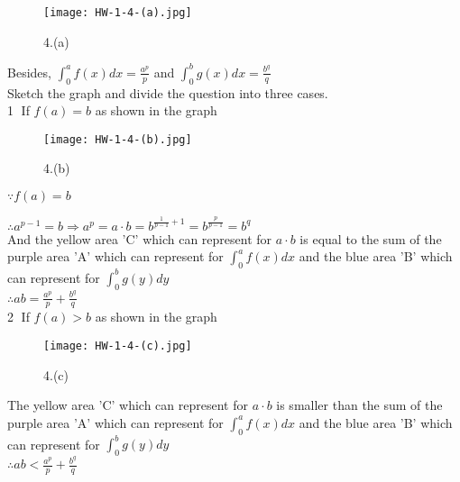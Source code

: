 \documentclass{article}
\begin{document}
\begin{figure}[H]
  \centering
  \texttt{[image: HW-1-4-(a).jpg]}\\
  \caption*{4.(a)}
\end{figure}

Besides, $\displaystyle\int_{0}^{a}f(x)dx=\frac{a^p}{p}$ and $\displaystyle\int_{0}^{b}g(x)dx=\frac{b^q}{q}$\\

Sketch the graph and divide the question into three cases.\\

\textcircled{1} If $f(a)=b$ as shown in the graph\\

\begin{figure}[H]
  \centering
  \texttt{[image: HW-1-4-(b).jpg]}\\
  \caption*{4.(b)}
\end{figure}

$\because$\qquad$f(a)=b$

$\therefore$\qquad$a^{p-1}=b\Rightarrow a^p=a\cdot b=b^{\frac{1}{p-1}+1}=b^{\frac{p}{p-1}}=b^{q}$\\

And the yellow area 'C' which can represent for $a\cdot b$ is equal to the sum of the purple area 'A' which can represent for $\displaystyle\int_{0}^{a}f(x)dx$ and the blue area 'B' which can represent for $\displaystyle\int_{0}^{b}g(y)dy$\\

$\therefore$\qquad$\displaystyle ab=\frac{a^p}{p}+\frac{b^q}{q}$\\

\textcircled{2} If $f(a)>b$ as shown in the graph\\

\begin{figure}[H]
  \centering
  \texttt{[image: HW-1-4-(c).jpg]}\\
  \caption*{4.(c)}
\end{figure}

The yellow area 'C' which can represent for $a\cdot b$ is smaller than the sum of the purple area 'A' which can represent for $\displaystyle\int_{0}^{a}f(x)dx$ and the blue area 'B' which can represent for $\displaystyle\int_{0}^{b}g(y)dy$\\

$\therefore$\qquad$\displaystyle ab<\frac{a^p}{p}+\frac{b^q}{q}$\\
\end{document}
